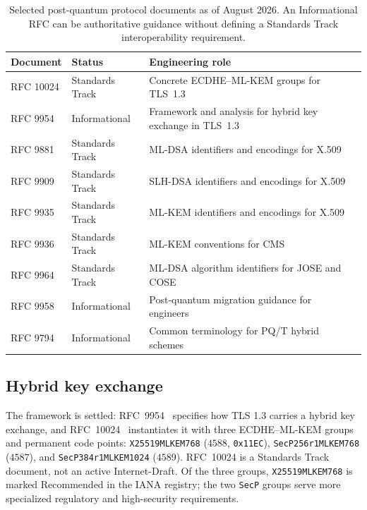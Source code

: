 \begin{table}[H]
\centering
\small
\begin{tabular}{p{}p{}p{}}
\toprule
Document & Status & Engineering role \\
\midrule
RFC 10024 & Standards Track & Concrete ECDHE--ML-KEM groups for TLS~1.3~\cite{rfc10024} \\
RFC 9954 & Informational & Framework and analysis for hybrid key exchange in TLS~1.3~\cite{rfc9954} \\
RFC 9881 & Standards Track & ML-DSA identifiers and encodings for X.509~\cite{rfc9881} \\
RFC 9909 & Standards Track & SLH-DSA identifiers and encodings for X.509~\cite{rfc9909} \\
RFC 9935 & Standards Track & ML-KEM identifiers and encodings for X.509~\cite{rfc9935} \\
RFC 9936 & Standards Track & ML-KEM conventions for CMS~\cite{rfc9936} \\
RFC 9964 & Standards Track & ML-DSA algorithm identifiers for JOSE and COSE~\cite{rfc9964} \\
RFC 9958 & Informational & Post-quantum migration guidance for engineers~\cite{rfc9958} \\
RFC 9794 & Informational & Common terminology for PQ/T hybrid schemes~\cite{rfc9794} \\
\bottomrule
\end{tabular}
\caption{Selected post-quantum protocol documents as of August 2026. An
Informational RFC can be authoritative guidance without defining a Standards
Track interoperability requirement.}
\label{tab:pqc-protocol-status-2026}
\end{table}

\subsection{Hybrid key exchange}
\label{sec:tls-hybrid}
The framework is settled: RFC~9954~\cite{rfc9954} specifies how TLS 1.3 carries a
hybrid key exchange, and RFC~10024~\cite{rfc10024} instantiates it with three
ECDHE--ML-KEM groups and permanent code points: \texttt{X25519MLKEM768}
($4588$, \texttt{0x11EC}), \texttt{SecP256r1MLKEM768} ($4587$), and
\texttt{SecP384r1MLKEM1024} ($4589$). RFC~10024 is a Standards Track document,
not an active Internet-Draft. Of the three groups, \texttt{X25519MLKEM768} is
marked Recommended in the IANA registry; the two \texttt{SecP} groups serve
more specialized regulatory and high-security requirements.

